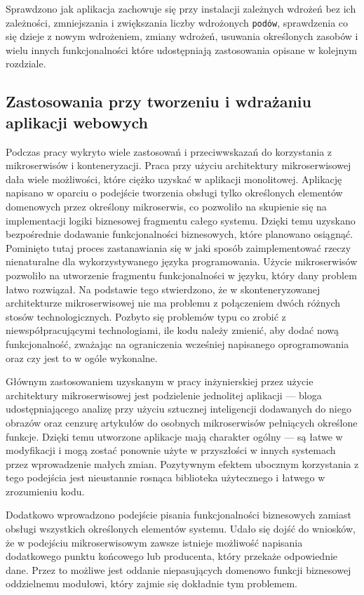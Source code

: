 \documentclass[12pt,twoside]{article}
\begin{document}
Sprawdzono jak aplikacja zachowuje się  przy instalacji zależnych wdrożeń bez ich zależności, zmniejszania i zwiększania liczby wdrożonych \texttt{podów}, sprawdzenia co się dzieje z nowym wdrożeniem, zmiany wdrożeń, usuwania określonych zasobów i wielu innych funkcjonalności które udostępniają zastosowania opisane w kolejnym rozdziale.

\subsection{Zastosowania przy tworzeniu i wdrażaniu aplikacji webowych}

Podczas pracy wykryto wiele zastosowań i przeciwwskazań do korzystania z mikroserwisów i konteneryzacji. Praca przy użyciu architektury mikroserwisowej dała wiele możliwości, które ciężko uzyskać w aplikacji monolitowej. Aplikację napisano w oparciu o podejście tworzenia obsługi tylko określonych elementów domenowych przez określony mikroserwis, co pozwoliło na skupienie się na implementacji logiki biznesowej fragmentu całego systemu. Dzięki temu uzyskano bezpośrednie dodawanie funkcjonalności biznesowych, które planowano osiągnąć. Pominięto tutaj proces zastanawiania się w jaki sposób zaimplementować rzeczy nienaturalne dla wykorzystywanego języka programowania. Użycie mikroserwisów pozwoliło na utworzenie fragmentu funkcjonalności w języku, który dany problem łatwo rozwiązał. Na podstawie tego stwierdzono, że w skonteneryzowanej architekturze mikroserwisowej nie ma problemu z połączeniem dwóch różnych stosów technologicznych. Pozbyto się problemów typu co zrobić z niewspółpracującymi technologiami, ile kodu należy zmienić, aby dodać nową funkcjonalność, zważając na ograniczenia wcześniej napisanego oprogramowania oraz czy jest to w ogóle wykonalne. 

Głównym zastosowaniem uzyskanym w pracy inżynierskiej przez użycie architektury mikroserwisowej jest podzielenie jednolitej aplikacji — bloga udostępniającego analizę przy użyciu sztucznej inteligencji dodawanych do niego obrazów oraz cenzurę artykułów do osobnych mikroserwisów pełniących określone funkcje. Dzięki temu utworzone aplikacje mają charakter ogólny — są łatwe w modyfikacji i mogą zostać ponownie użyte w przyszłości w innych systemach przez wprowadzenie małych zmian. Pozytywnym efektem ubocznym korzystania z tego podejścia jest nieustannie rosnąca biblioteka użytecznego i łatwego w zrozumieniu kodu.

Dodatkowo wprowadzono podejście pisania funkcjonalności biznesowych zamiast obsługi wszystkich określonych elementów systemu. Udało się dojść do wniosków, że w podejściu mikroserwisowym zawsze istnieje możliwość napisania dodatkowego punktu końcowego lub producenta, który przekaże odpowiednie dane. Przez to możliwe jest oddanie niepasujących domenowo funkcji biznesowej oddzielnemu modułowi, który zajmie się dokładnie tym problemem.
\end{document}
